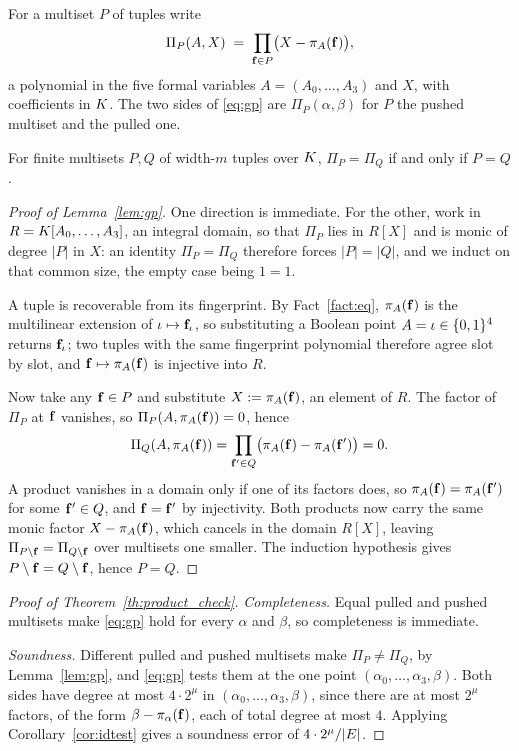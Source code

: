 \begin{lemma}\label{lem:gp}
For a multiset $P$ of tuples write
\[
  \Pi_P(A,X)\;=\;\prod_{\mathbf{f}\in P}\bigl(X-\pi_A(\mathbf{f})\bigr),
\]
a polynomial in the five formal variables $A=(A_0,\dots,A_3)$ and $X$, with coefficients in $K$. The two sides of \eqref{eq:gp} are $\Pi_P(\alpha,\beta)$ for $P$ the pushed multiset and the pulled one.

For finite multisets $P,Q$ of width-$m$ tuples over $K$, $\Pi_P=\Pi_Q$ if and only if $P=Q$.
\end{lemma}

\begin{proof}[Proof of Lemma~\ref{lem:gp}]
One direction is immediate. For the other, work in $R=K[A_0,\dots,A_3]$, an integral domain, so that $\Pi_P$ lies in $R[X]$ and is monic of degree $|P|$ in $X$: an identity $\Pi_P=\Pi_Q$ therefore forces $|P|=|Q|$, and we induct on that common size, the empty case being $1=1$.

A tuple is recoverable from its fingerprint. By Fact~\ref{fact:eq}, $\pi_A(\mathbf{f})$ is the multilinear extension of $\iota\mapsto\mathbf{f}_\iota$, so substituting a Boolean point $A=\iota\in\{0,1\}^{4}$ returns $\mathbf{f}_\iota$; two tuples with the same fingerprint polynomial therefore agree slot by slot, and $\mathbf{f}\mapsto\pi_A(\mathbf{f})$ is injective into $R$.

Now take any $\mathbf{f}\in P$ and substitute $X:=\pi_A(\mathbf{f})$, an element of $R$. The factor of $\Pi_P$ at $\mathbf{f}$ vanishes, so $\Pi_P(A,\pi_A(\mathbf{f}))=0$, hence
\[
  \Pi_Q(A,\pi_A(\mathbf{f}))=\prod_{\mathbf{f}'\in Q}\bigl(\pi_A(\mathbf{f})-\pi_A(\mathbf{f}')\bigr)=0 .
\]
A product vanishes in a domain only if one of its factors does, so $\pi_A(\mathbf{f})=\pi_A(\mathbf{f}')$ for some $\mathbf{f}'\in Q$, and $\mathbf{f}=\mathbf{f}'$ by injectivity. Both products now carry the same monic factor $X-\pi_A(\mathbf{f})$, which cancels in the domain $R[X]$, leaving $\Pi_{P\setminus\mathbf{f}}=\Pi_{Q\setminus\mathbf{f}}$ over multisets one smaller. The induction hypothesis gives $P\setminus\mathbf{f}=Q\setminus\mathbf{f}$, hence $P=Q$.
\end{proof}


\begin{proof}[Proof of Theorem~\ref{th:product_check}]
\emph{Completeness.} Equal pulled and pushed multisets make \eqref{eq:gp} hold for every $\alpha$ and $\beta$, so completeness is immediate.

\emph{Soundness.} Different pulled and pushed multisets make $\Pi_P\neq\Pi_Q$, by Lemma~\ref{lem:gp}, and \eqref{eq:gp} tests them at the one point $(\alpha_0, \dots, \alpha_3, \beta)$. Both sides have degree at most $4\cdot 2^{\mu}$ in $(\alpha_0, \dots, \alpha_3, \beta)$, since there are at most $2^{\mu}$ factors, of the form $\beta-\pi_\alpha(\mathbf{f})$, each of total degree at most $4$. Applying Corollary~\ref{cor:idtest} gives a soundness error of $4\cdot 2^{\mu}/|E|$.
\end{proof}

